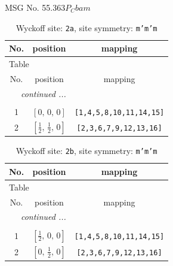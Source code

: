 \documentclass[fleqn,8pt]{jsarticle}
\begin{document}
\setcounter{MaxMatrixCols}{32}

\renewcommand{\tablename}{Table~}
\renewcommand{\figurename}{Figure~}
\begin{center}
\LARGE
MSG No. 55.363\quad$P_{C}bam$
\end{center}
\renewcommand{\arraystretch}{1.2}
\begin{longtable}{ccc}
\caption{Wyckoff site: {\tt 2a}, site symmetry: {\tt m'm'm}}
 \\
 \hline \hline
No. & position & mapping \\ \hline \endfirsthead

\multicolumn{2}{l}{\tablename\ \thetable{}} \\
 \hline \hline
No. & position & mapping \\ \hline \endhead

 \hline \hline
\multicolumn{2}{r}{\footnotesize\it continued ...} \\ \endfoot

 \hline \hline
\multicolumn{2}{r}{} \\ \endlastfoot

1 & $\left[ 0,\, 0,\, 0 \right]$ & {\tt [1,4,5,8,10,11,14,15]} \\ \hline
2 & $\left[ \frac{1}{2},\, \frac{1}{2},\, 0 \right]$ & {\tt [2,3,6,7,9,12,13,16]} \\
\end{longtable}
\renewcommand{\arraystretch}{1.2}
\begin{longtable}{ccc}
\caption{Wyckoff site: {\tt 2b}, site symmetry: {\tt m'm'm}}
 \\
 \hline \hline
No. & position & mapping \\ \hline \endfirsthead

\multicolumn{2}{l}{\tablename\ \thetable{}} \\
 \hline \hline
No. & position & mapping \\ \hline \endhead

 \hline \hline
\multicolumn{2}{r}{\footnotesize\it continued ...} \\ \endfoot

 \hline \hline
\multicolumn{2}{r}{} \\ \endlastfoot

1 & $\left[ \frac{1}{2},\, 0,\, 0 \right]$ & {\tt [1,4,5,8,10,11,14,15]} \\ \hline
2 & $\left[ 0,\, \frac{1}{2},\, 0 \right]$ & {\tt [2,3,6,7,9,12,13,16]} \\
\end{longtable}
\end{document}
